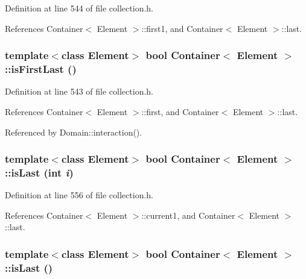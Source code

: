 Definition at line 544 of file collection.h.

References Container$<$ Element $>$::first1, and Container$<$ Element $>$::last.\hypertarget{classContainer_167afe8b220e609e29f62a261a32911d}{
\subsubsection[{isFirstLast}]{\setlength{\rightskip}{0pt plus 5cm}template$<$class Element$>$ bool {\bf Container}$<$ Element $>$::isFirstLast ()}}
\label{classContainer_167afe8b220e609e29f62a261a32911d}




Definition at line 543 of file collection.h.

References Container$<$ Element $>$::first, and Container$<$ Element $>$::last.

Referenced by Domain::interaction().\hypertarget{classContainer_4213c7c9f238c8c8ad972bcdb157cbad}{
\subsubsection[{isLast}]{\setlength{\rightskip}{0pt plus 5cm}template$<$class Element$>$ bool {\bf Container}$<$ Element $>$::isLast (int {\em i})}}
\label{classContainer_4213c7c9f238c8c8ad972bcdb157cbad}




Definition at line 556 of file collection.h.

References Container$<$ Element $>$::current1, and Container$<$ Element $>$::last.\hypertarget{classContainer_e252da66eea8ad52294ccf69e4393e6b}{
\subsubsection[{isLast}]{\setlength{\rightskip}{0pt plus 5cm}template$<$class Element$>$ bool {\bf Container}$<$ Element $>$::isLast ()}}
\label{classContainer_e252da66eea8ad52294ccf69e4393e6b}





